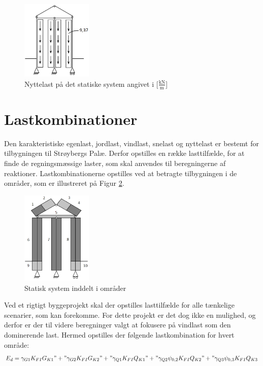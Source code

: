 \begin{figure}[htbp]
	\centering
	\includegraphics[width=0.3\textwidth]{billeder/nyttelast.png}
	\caption{Nyttelast på det statiske system angivet i [$\frac{\text{kN}}{\text{m}}$]}
	\label{fig:nyttelast}
\end{figure}

\section{Lastkombinationer}
Den karakteristiske egenlast, jordlast, vindlast, snelast og nyttelast er bestemt for tilbygningen til Strøybergs Palæ. Derfor opstilles en række lasttilfælde, for at finde de regningsmæssige laster, som skal anvendes til beregningerne af reaktioner. Lastkombinationerne opstilles ved at betragte tilbygningen i de områder, som er illustreret på Figur \ref{fig:omraader}.

\begin{figure}[htbp]
	\centering
	\includegraphics[width=0.3\textwidth]{billeder/indeling.png}
	\caption{Statisk system inddelt i områder}
	\label{fig:omraader}
\end{figure}

Ved et rigtigt byggeprojekt skal der opstilles lasttilfælde for alle tænkelige scenarier, som kan forekomme. For dette projekt er det dog ikke en mulighed, og derfor er der til videre beregninger valgt at fokusere på vindlast som den dominerende last. Hermed opstilles der følgende lastkombination for hvert område:
\begin{equation}
	E_d = \gamma_{G1} K_{FI} G_{K1}" + "\gamma_{G2} K_{FI} G_{K2}" + "\gamma_{Q1} K_{FI} Q_{K1}" + "\gamma_{Q2} \psi_{0,2} K_{FI} Q_{K2}" + "\gamma_{Q3} \psi_{0,3} K_{FI} Q_{K3}
\end{equation}

